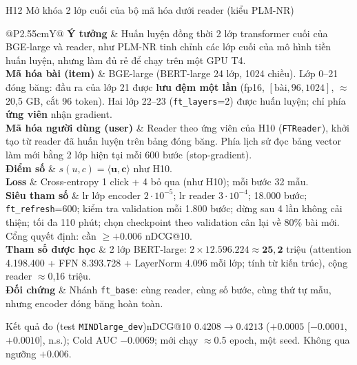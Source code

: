 \documentclass[aspectratio=169,t]{beamer}
\makeatletter
\newcommand{\code}[1]{\texttt{#1}}
\newcommand{\bangmota}[1]{{\scriptsize\renewcommand{\arraystretch}{1.1}\setlength{\tabcolsep}{4pt}%
  \begin{tabularx}{\textwidth}{@{}P{2.55cm}Y@{}}\toprule #1 \bottomrule\end{tabularx}}}
\newcommand{\rw}[2]{\textbf{#1} & #2\\ \midrule}
\newcommand{\rwl}[2]{\textbf{#1} & #2\\}
\newcommand{\ketqua}[1]{\begin{exampleblock}{Kết quả đo (test \code{MINDlarge\_dev})}\scriptsize #1\end{exampleblock}}
\makeatother
\begin{document}
\begin{frame}[shrink]{H12 \textperiodcentered{} Mở khóa 2 lớp cuối của bộ mã hóa dưới reader (kiểu PLM-NR)}
\bangmota{
\rw{Ý tưởng}{Huấn luyện đồng thời 2 lớp transformer cuối của BGE-large và reader, như PLM-NR tinh chỉnh các lớp cuối của mô hình tiền huấn luyện, nhưng làm đủ rẻ để chạy trên một GPU T4.}
\rw{Mã hóa bài (item)}{BGE-large (BERT-large 24 lớp, 1024 chiều). Lớp 0--21 đóng băng: đầu ra của lớp 21 được \textbf{lưu đệm một lần} (fp16, $[\text{bài},96,1024]$, $\approx$20,5 GB, cắt 96 token). Hai lớp 22--23 (\code{ft\_layers}=2) được huấn luyện; chỉ phía \textbf{ứng viên} nhận gradient.}
\rw{Mã hóa người dùng (user)}{Reader theo ứng viên của H10 (\code{FTReader}), khởi tạo từ reader đã huấn luyện trên bảng đóng băng. Phía lịch sử đọc bảng vector làm mới bằng 2 lớp hiện tại mỗi 600 bước (stop-gradient).}
\rw{Điểm số}{$s(u,c)=\langle\mathbf u,\mathbf c\rangle$ như H10.}
\rw{Loss}{Cross-entropy 1 click + 4 bỏ qua (như H10); mỗi bước 32 mẫu.}
\rw{Siêu tham số}{lr lớp encoder $2\cdot10^{-5}$; lr reader $3\cdot10^{-4}$; 18.000 bước; \code{ft\_refresh}=600; kiểm tra validation mỗi 1.800 bước; dừng sau 4 lần không cải thiện; tối đa 110 phút; chọn checkpoint theo validation cân lại về 80\% bài mới. Cổng quyết định: cần $\ge+0.006$ nDCG@10.}
\rw{Tham số được học}{2 lớp BERT-large: $2\times12.596.224\approx\mathbf{25,2}$ triệu (attention 4.198.400 + FFN 8.393.728 + LayerNorm 4.096 mỗi lớp; tính từ kiến trúc), cộng reader $\approx$0,16 triệu.}
\rwl{Đối chứng}{Nhánh \code{ft\_base}: cùng reader, cùng số bước, cùng thứ tự mẫu, nhưng encoder đóng băng hoàn toàn.}
}
\ketqua{nDCG@10 $0.4208\to0.4213$ ($+0.0005$ [$-0.0001$, $+0.0010$], n.s.); Cold AUC $-0.0069$; mới chạy $\approx$0.5 epoch, một seed. Không qua ngưỡng $+0.006$.}
\par\kern0pt
\end{frame}
\end{document}
